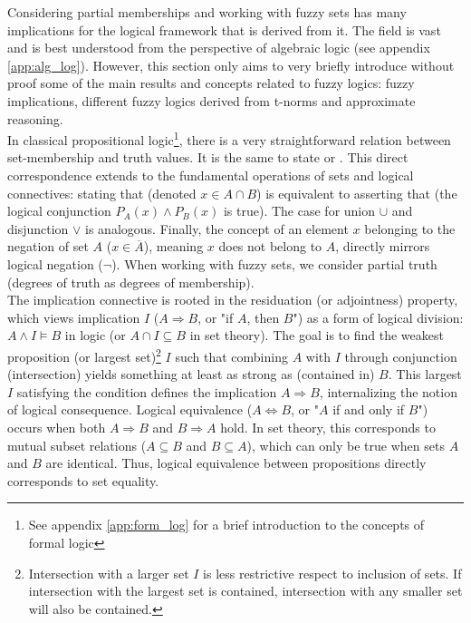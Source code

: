 
Considering partial memberships and working with fuzzy sets has many implications for the logical framework that is derived from it. The field is vast and is best understood from the perspective of algebraic logic (see appendix \ref{app:alg_log}). However, this section only aims to very briefly introduce without proof some of the main results and concepts related to fuzzy logics: fuzzy implications, different fuzzy logics derived from t-norms and approximate reasoning.\\

In classical propositional logic\footnote{See appendix \ref{app:form_log} for a brief introduction to the concepts of formal logic}, there is a very straightforward relation between set-membership and truth values. It is the same to state  or . This direct correspondence extends to the fundamental operations of sets and logical connectives: stating that  (denoted $x \in A \cap B$) is equivalent to asserting that  (the logical conjunction $P_A(x) \land P_B(x)$ is true). The case for union $\cup$ and disjunction $\lor$ is analogous. Finally, the concept of an element $x$ belonging to the negation of set $A$ ($x \in \overline{A}$), meaning $x$ does not belong to $A$, directly mirrors logical negation ($\neg$). When working with fuzzy sets, we consider partial truth (degrees of truth as degrees of membership).\\

The implication connective is rooted in the residuation (or adjointness) property, which views implication $I$ ($A \Rightarrow B$, or "if $A$, then $B$") as a form of logical division: $A \land I \models B$ in logic (or $A \cap I \subseteq B$ in set theory). The goal is to find the weakest proposition (or largest set)\footnote{Intersection with a larger set $I$ is less restrictive respect to inclusion of sets. If intersection with the largest set is contained, intersection with any smaller set will also be contained.} $I$ such that combining $A$ with $I$ through conjunction (intersection) yields something at least as strong as (contained in) $B$. This largest $I$ satisfying the condition defines the implication $A \Rightarrow B$, internalizing the notion of logical consequence. Logical equivalence ($A \iff B$, or "$A$ if and only if $B$") occurs when both $A \Rightarrow B$ and $B \Rightarrow A$ hold. In set theory, this corresponds to mutual subset relations ($A \subseteq B$ and $B \subseteq A$), which can only be true when sets $A$ and $B$ are identical. Thus, logical equivalence between propositions directly corresponds to set equality.





